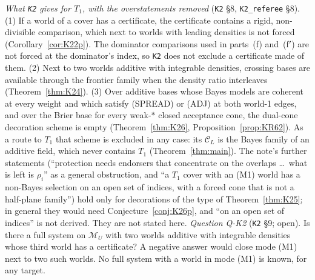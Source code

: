 \documentclass[11pt]{article}
\theoremstyle{definition}
\theoremstyle{remark}
\newcommand{\M}{\mathcal M}
\newcommand{\C}{\mathcal C}
\newcommand{\src}[1]{\texttt{#1}}
\begin{document}
\emph{What \src{K2} gives for $T_1$, with the overstatements removed} (\src{K2} \S8, \src{K2\_referee} \S8). (1) If a world of a cover has a certificate, the certificate contains a rigid, non-divisible comparison, which next to worlds with leading densities is not forced (Corollary~\ref{cor:K22p}). The dominator comparisons used in parts~(f) and~(f$'$) are not forced at the dominator's index, so \src{K2} does not exclude a certificate made of them. (2) Next to two worlds additive with integrable densities, crossing bases are available through the frontier family when the density ratio interleaves (Theorem~\ref{thm:K24}). (3) Over additive bases whose Bayes models are coherent at every weight and which satisfy (SPREAD) or (ADJ) at both world-1 edges, and over the Brier base for every weak-$*$ closed acceptance cone, the dual-cone decoration scheme is empty (Theorem~\ref{thm:K26}, Proposition~\ref{prop:KR62}). As a route to $T_1$ that scheme is excluded in any case: its $\C_L$ is the Bayes family of an additive field, which never contains $T_1$ (Theorem~\ref{thm:main}). The note's further statements (``protection needs endorsers that concentrate on the overlaps \dots\ what is left is $\rho_i$'' as a general obstruction, and ``a $T_1$ cover with an (M1) world has a non-Bayes selection on an open set of indices, with a forced cone that is not a half-plane family'') hold only for decorations of the type of Theorem~\ref{thm:K25}; in general they would need Conjecture~\ref{conj:K26p}, and ``on an open set of indices'' is not derived. They are not stated here. \emph{Question Q-K2} (\src{K2} \S9; open). Is there a full system on $\M_U$ with two worlds additive with integrable densities whose third world has a certificate? A negative answer would close mode (M1) next to two such worlds. No full system with a world in mode (M1) is known, for any target.
\end{document}

